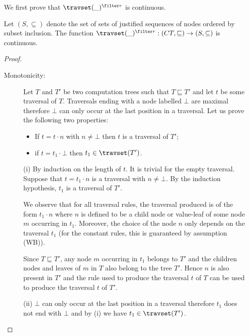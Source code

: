 We first prove that $\travset(\_)^{\filter r}$ is continuous.
\begin{lemma}
\label{lem:travred_continuous} Let $(S,\subseteq)$ denote the set of
sets of justified sequences of nodes ordered by subset inclusion.
The function $\travset(\_)^{\filter r} : (CT,\sqsubseteq)
\rightarrow (S,\subseteq)$ is continuous.
\end{lemma}
\begin{proof} \
    \begin{description}
    \item[Monotonicity:] Let $T$ and $T'$ be two computation trees such that $T \sqsubseteq T'$
    and let $t$ be some traversal of $T$.
    Traversals ending with a node labelled $\bot$ are maximal therefore $\bot$ can only occur
    at the last position in a traversal. Let us prove the following two properties:
        \begin{itemize}
            \item[(i)]  If $t = t \cdot n$ with $n\neq \bot$ then $t$ is a traversal of $T'$;
            \item[(ii)] if $t= t_1 \cdot \bot$ then $t_1\in \travset(T')$.
        \end{itemize}

        (i) By induction on the length of $t$. It is trivial for the empty traversal.
            Suppose that $t = t_1 \cdot n$ is a traversal with $n \neq \bot$.
            By the induction hypothesis, $t_1$ is a traversal of $T'$.

            We observe that for all traversal rules, the traversal produced is of the form $t_1 \cdot n$ where
            $n$ is defined to be a child node or value-leaf of some node $m$ occurring in $t_1$.
            Moreover, the choice of the node $n$ only depends on the traversal $t_1$
            (for the constant rules, this is guaranteed by assumption (WB)).

            Since $T \sqsubseteq T'$, any node $m$ occurring in $t_1$ belongs
            to $T'$ and the children nodes and leaves of $m$ in $T$ also belong to the tree $T'$.
            Hence $n$ is also present in $T'$ and the rule used to produce the traversal $t$ of $T$
            can be used to produce the traversal $t$ of $T'$.

        (ii) $\bot$ can only occur at the last position in a traversal
        therefore $t_1$ does not end with $\bot$ and by (i) we have $t_1\in \travset(T')$.
\vspace{6pt}


\end{description}
\end{proof}
